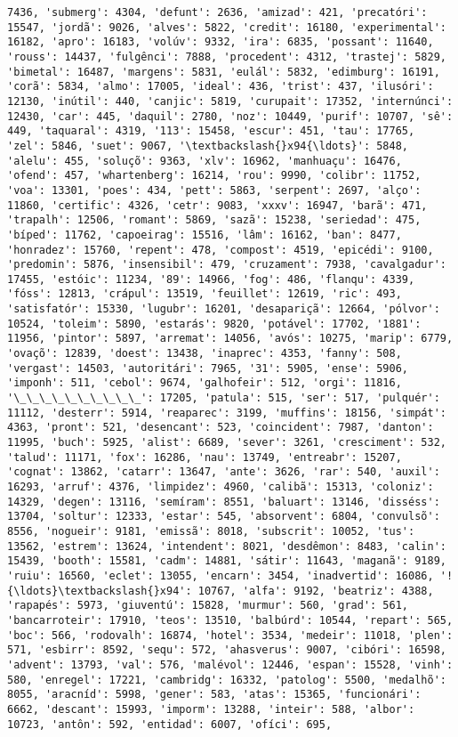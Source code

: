 \begin{Verbatim}[commandchars=\\\{\}]
7436, 'submerg': 4304, 'defunt': 2636, 'amizad': 421, 'precatóri': 15547, 'jordã': 9026, 'alves': 5822, 'credit': 16180, 'experimental': 16182, 'apro': 16183, 'volúv': 9332, 'ira': 6835, 'possant': 11640, 'rouss': 14437, 'fulgênci': 7888, 'procedent': 4312, 'trastej': 5829, 'bimetal': 16487, 'margens': 5831, 'eulál': 5832, 'edimburg': 16191, 'corã': 5834, 'almo': 17005, 'ideal': 436, 'trist': 437, 'ilusóri': 12130, 'inútil': 440, 'canjic': 5819, 'curupait': 17352, 'internúnci': 12430, 'car': 445, 'daquil': 2780, 'noz': 10449, 'purif': 10707, 'sê': 449, 'taquaral': 4319, '113': 15458, 'escur': 451, 'tau': 17765, 'zel': 5846, 'suet': 9067, '\textbackslash{}x94{\ldots}': 5848, 'alelu': 455, 'soluçõ': 9363, 'xlv': 16962, 'manhuaçu': 16476, 'ofend': 457, 'whartenberg': 16214, 'rou': 9990, 'colibr': 11752, 'voa': 13301, 'poes': 434, 'pett': 5863, 'serpent': 2697, 'alço': 11860, 'certific': 4326, 'cetr': 9083, 'xxxv': 16947, 'barã': 471, 'trapalh': 12506, 'romant': 5869, 'sazã': 15238, 'seriedad': 475, 'bíped': 11762, 'capoeirag': 15516, 'lâm': 16162, 'ban': 8477, 'honradez': 15760, 'repent': 478, 'compost': 4519, 'epicédi': 9100, 'predomin': 5876, 'insensibil': 479, 'cruzament': 7938, 'cavalgadur': 17455, 'estóic': 11234, '89': 14966, 'fog': 486, 'flanqu': 4339, 'fóss': 12813, 'crápul': 13519, 'feuillet': 12619, 'ric': 493, 'satisfatór': 15330, 'lugubr': 16201, 'desapariçã': 12664, 'pólvor': 10524, 'toleim': 5890, 'estarás': 9820, 'potável': 17702, '1881': 11956, 'pintor': 5897, 'arremat': 14056, 'avós': 10275, 'marip': 6779, 'ovaçõ': 12839, 'doest': 13438, 'inaprec': 4353, 'fanny': 508, 'vergast': 14503, 'autoritári': 7965, '31': 5905, 'ense': 5906, 'imponh': 511, 'cebol': 9674, 'galhofeir': 512, 'orgi': 11816, '\_\_\_\_\_\_\_\_\_\_': 17205, 'patula': 515, 'ser': 517, 'pulquér': 11112, 'desterr': 5914, 'reaparec': 3199, 'muffins': 18156, 'simpát': 4363, 'pront': 521, 'desencant': 523, 'coincident': 7987, 'danton': 11995, 'buch': 5925, 'alist': 6689, 'sever': 3261, 'cresciment': 532, 'talud': 11171, 'fox': 16286, 'nau': 13749, 'entreabr': 15207, 'cognat': 13862, 'catarr': 13647, 'ante': 3626, 'rar': 540, 'auxil': 16293, 'arruf': 4376, 'limpidez': 4960, 'calibã': 15313, 'coloniz': 14329, 'degen': 13116, 'semíram': 8551, 'baluart': 13146, 'disséss': 13704, 'soltur': 12333, 'estar': 545, 'absorvent': 6804, 'convulsõ': 8556, 'nogueir': 9181, 'emissã': 8018, 'subscrit': 10052, 'tus': 13562, 'estrem': 13624, 'intendent': 8021, 'desdêmon': 8483, 'calin': 15439, 'booth': 15581, 'cadm': 14881, 'sátir': 11643, 'maganã': 9189, 'ruiu': 16560, 'eclet': 13055, 'encarn': 3454, 'inadvertid': 16086, '!{\ldots}\textbackslash{}x94': 10767, 'alfa': 9192, 'beatriz': 4388, 'rapapés': 5973, 'giuventú': 15828, 'murmur': 560, 'grad': 561, 'bancarroteir': 17910, 'teos': 13510, 'balbúrd': 10544, 'repart': 565, 'boc': 566, 'rodovalh': 16874, 'hotel': 3534, 'medeir': 11018, 'plen': 571, 'esbirr': 8592, 'sequ': 572, 'ahasverus': 9007, 'cibóri': 16598, 'advent': 13793, 'val': 576, 'malévol': 12446, 'espan': 15528, 'vinh': 580, 'enregel': 17221, 'cambridg': 16332, 'patolog': 5500, 'medalhõ': 8055, 'aracníd': 5998, 'gener': 583, 'atas': 15365, 'funcionári': 6662, 'descant': 15993, 'imporm': 13288, 'inteir': 588, 'albor': 10723, 'antôn': 592, 'entidad': 6007, 'ofíci': 695, 
\end{Verbatim}
